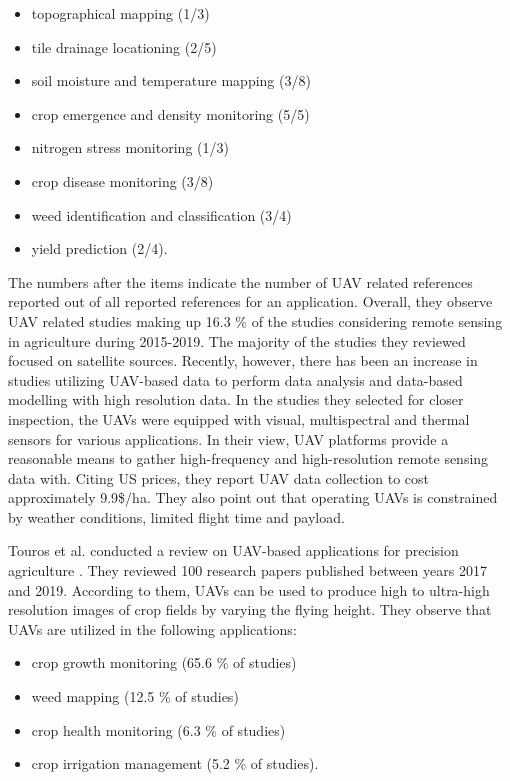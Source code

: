 \begin{itemize}
    \item topographical mapping (1/3)
    \item tile drainage locationing (2/5)
    \item soil moisture and temperature mapping (3/8)
    \item crop emergence and density monitoring (5/5)
    \item nitrogen stress monitoring (1/3)
    \item crop disease monitoring (3/8)
    \item weed identification and classification (3/4)
    \item yield prediction (2/4).
\end{itemize}

The numbers after the items indicate the number of UAV related references reported out of all reported references for an application. Overall, they observe UAV related studies making up 16.3 \% of the studies considering remote sensing in agriculture during 2015-2019. The majority of the studies they reviewed focused on satellite sources. Recently, however, there has been an increase in studies utilizing UAV-based data to perform data analysis and data-based modelling with high resolution data. In the studies they selected for closer inspection, the UAVs were equipped with visual, multispectral and thermal sensors for various applications. In their view, UAV platforms provide a reasonable means to gather high-frequency and high-resolution remote sensing data with. Citing US prices, they report UAV data collection to cost approximately 9.9\$/ha. They also point out that operating UAVs is constrained by weather conditions, limited flight time and payload.

Touros et al. conducted a review on UAV-based applications for precision agriculture \cite{Tsouros2019}. They reviewed 100 research papers published between years 2017 and 2019. According to them, UAVs can be used to produce high to ultra-high resolution images of crop fields by varying the flying height. They observe that UAVs are utilized in the following applications:

\begin{itemize}
    \item crop growth monitoring (65.6 \% of studies)
    \item weed mapping (12.5 \% of studies)
    \item crop health monitoring (6.3 \% of studies)
    \item crop irrigation management (5.2 \% of studies).
\end{itemize}

